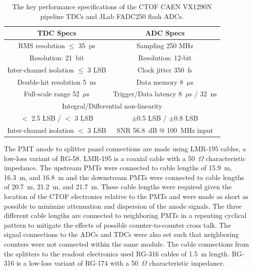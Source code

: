 \documentclass[3p,times,twocolumn]{elsarticle}
\begin{document}
\begin{table}[htbp]
\begin{center}
\begin{tabular}{c|c} \hline
TDC Specs                           & ADC Specs \\ \hline
RMS resolution $\le$ 35~ps          & Sampling 250 MHz \\  
Resolution: 21~bit                  & Resolution: 12-bit \\
Inter-channel isolation $\le$ 3 LSB & Clock jitter 350~fs \\
Double-hit resolution 5~ns          & Data memory 8~$\mu$s \\    
Full-scale range 52~$\mu$s          & Trigger/Data latency 8~$\mu$s / 32~ns \\
\multicolumn{2}{c}{Integral/Differential non-linearity} \\
$<$ 2.5 LSB / $<$ 3 LSB             & $\pm$0.5 LSB / $\pm$0.8 LSB \\
Inter-channel isolation $<$ 3 LSB   & SNR 56.8~dB @ 100~MHz input \\ \hline
\end{tabular}
\end{center}
\caption{The key performance specifications of the CTOF CAEN VX1290N pipeline TDCs and JLab 
FADC250 flash ADCs.}
\label{tdcadc-specs}
\end{table}

The PMT anode to splitter panel connections are made using LMR-195 cables, a low-loss variant of RG-58.
LMR-195 is a coaxial cable with a 50~$\Omega$ characteristic impedance. The upstream PMTs were
connected to cable lengths of 15.9~m, 16.3~m, and 16.8~m and the downstream PMTs were connected to
cable lengths of 20.7~m, 21.2~m, and 21.7~m. These cable lengths were required given the location of the
CTOF electronics relative to the PMTs and were made as short as possible to minimize attenuation and
dispersion of the anode signals. The three different cable lengths are connected to neighboring PMTs in
a repeating cyclical pattern to mitigate the effects of possible counter-to-counter cross talk. The signal
connections to the ADCs and TDCs were also set such that neighboring counters were not connected within
the same module. The cable connections from the splitters to the readout electronics used RG-316 cables
of 1.5~m length. RG-316 is a low-loss variant of RG-174 with a 50~$\Omega$ characteristic impedance.
\end{document}
